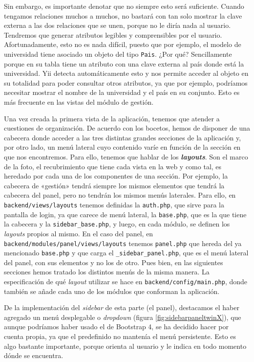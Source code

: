 Sin embargo, es importante denotar que no siempre esto será suficiente. Cuando tengamos relaciones muchos a muchos, no bastará con tan solo mostrar la clave externa a las dos relaciones que se unen, porque no le diría nada al usuario. Tendremos que generar atributos legibles y comprensibles por el usuario. Afortunadamente, esto no es nada difícil, puesto que por ejemplo, el modelo de universidad tiene asociado un objeto del tipo \texttt{Pais}. ¿Por qué? Sencillamente porque en su tabla tiene un atributo con una clave externa al país donde está la universidad. Yii detecta automáticamente esto y nos permite acceder al objeto en su totalidad para poder consultar otros atributos, ya que por ejemplo, podríamos necesitar mostrar el nombre de la universidad y el país en su conjunto. Esto es más frecuente en las vistas del módulo de gestión.

Una vez creada la primera vista de la aplicación, tenemos que atender a cuestiones de organización. De acuerdo con los bocetos, hemos de disponer de una cabecera donde acceder a las tres distintas grandes secciones de la aplicación y, por otro lado, un menú lateral cuyo contenido varíe en función de la sección en que nos encontremos. Para ello, tenemos que hablar de los  \textbf{\textit{layouts}}. Son el marco de la foto, el recubrimiento que tiene cada vista en la web y como tal, es heredado por cada una de los componentes de una sección. Por ejemplo, la cabecera de «gestión» tendrá siempre los mismos elementos que tendrá la cabecera del panel, pero no tendrán los mismos menús laterales. Para ello, en \texttt{backend/views/layouts} tenemos definidas la \texttt{auth.php}, que sirve para la pantalla de login, ya que carece de menú lateral, la \texttt{base.php}, que es la que tiene la cabecera y la \texttt{sidebar\_base.php}, y luego, en cada módulo, se definen los \textit{layouts} propios al mismo. En el caso del panel, en \texttt{backend/modules/panel/views/layouts} tenemos \texttt{panel.php} que hereda del ya mencionado \texttt{base.php} y que carga el \texttt{\_sidebar\_panel.php}, que es el menú lateral del panel, con sus elementos y no los de otro. Pues bien, en las siguientes secciones hemos tratado los distintos menús de la misma manera. La especificación de qué \textit{layout} utilizar se hace en \texttt{backend/config/main.php}, donde también se añade cada uno de los módulos que conforman la aplicación.

De la implementación del \textit{sidebar} de esta parte (el panel), destacamos el haber agregado un menú desplegable o \textit{dropdown} (figura \ref{fig:sidebarpaneltwinX}), que aunque podríamos haber usado el de Bootstrap 4, se ha decidido hacer por cuenta propia, ya que el predefinido no mantenía el menú persistente. Esto es algo bastante importante, porque orienta al usuario y le indica en todo momento dónde se encuentra.

